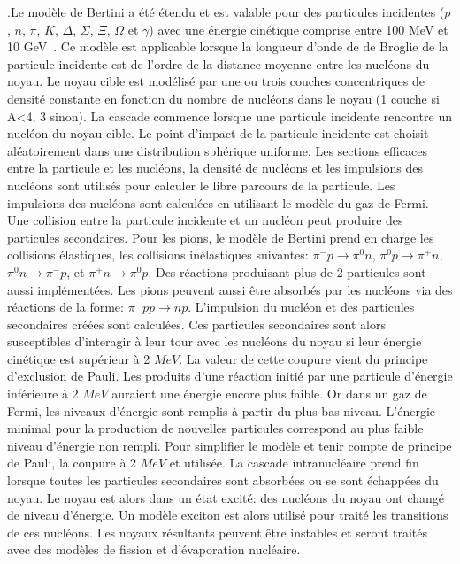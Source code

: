 .Le modèle de Bertini a été étendu et est valable pour des particules incidentes ($p$, $n$, $\pi$, $K$, $\Delta$, $\Sigma$, $\Xi$, $\Omega$ et $\gamma$) avec une énergie cinétique comprise entre 100 MeV et 10 GeV~\cite{geant4_bertini}. Ce modèle est applicable lorsque la longueur d'onde de de Broglie de la particule incidente est de l'ordre de la distance moyenne entre les nucléons du noyau. Le noyau cible est modélisé par une ou trois couches concentriques de densité constante en fonction du nombre de nucléons dans le noyau (1 couche si A<4, 3 sinon). La cascade commence lorsque une particule incidente rencontre un nucléon du noyau cible. Le point d'impact de la particule incidente est choisit aléatoirement dans une distribution sphérique uniforme. Les sections efficaces entre la particule et les nucléons, la densité de nucléons et les impulsions des nucléons sont utilisés pour calculer le libre parcours de la particule. Les impulsions des nucléons sont calculées en utilisant le modèle du gaz de Fermi. Une collision entre la particule incidente et un nucléon peut produire des particules secondaires. Pour les pions, le modèle de Bertini prend en charge les collisions élastiques, les collisions inélastiques suivantes: $\pi^-p\rightarrow\pi^0n$, $\pi^0p\rightarrow\pi^+n$, $\pi^0n\rightarrow\pi^-p$, et $\pi^+n\rightarrow\pi^0p$. Des réactions produisant plus de 2 particules sont aussi implémentées. Les pions peuvent aussi être absorbés par les nucléons via des réactions de la forme: $\pi^-pp\rightarrow np$. L'impulsion du nucléon et des particules secondaires créées sont calculées. Ces particules secondaires sont alors susceptibles d'interagir à leur tour avec les nucléons du noyau si leur énergie cinétique est supérieur à 2 $MeV$. La valeur de cette coupure vient du principe d'exclusion de Pauli. Les produits d'une réaction initié par une particule d'énergie inférieure à 2 $MeV$ auraient une énergie encore plus faible. Or dans un gaz de Fermi, les niveaux d'énergie sont remplis à partir du plus bas niveau. L'énergie minimal pour la production de nouvelles particules correspond au plus faible niveau d'énergie non rempli. Pour simplifier le modèle et tenir compte de principe de Pauli, la coupure à 2 $MeV$ et utilisée. La cascade intranucléaire prend fin lorsque toutes les particules secondaires sont absorbées ou se sont échappées du noyau. Le noyau est alors dans un état excité: des nucléons du noyau ont changé de niveau d'énergie. Un modèle exciton est alors utilisé pour traité les transitions de ces nucléons. Les noyaux résultants peuvent être instables et seront traités avec des modèles de fission et d'évaporation nucléaire.

